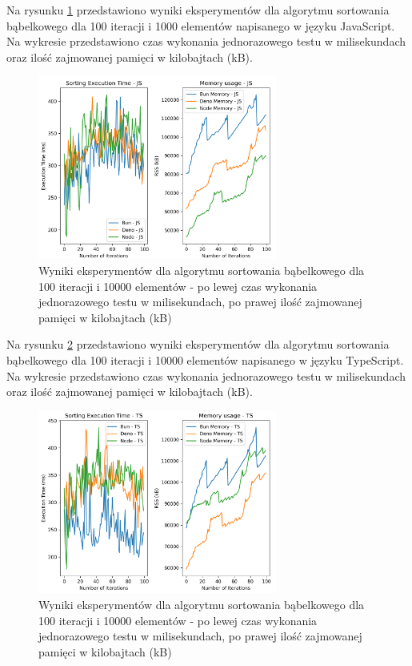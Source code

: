 Na rysunku \ref{fig:bubble_sorting_e2} przedstawiono wyniki eksperymentów dla algorytmu sortowania bąbelkowego dla 100 iteracji i 1000 elementów napisanego w języku JavaScript. Na wykresie przedstawiono czas wykonania jednorazowego testu w milisekundach oraz ilość zajmowanej pamięci w kilobajtach (kB).

\begin{figure}[H]
  \centering
  \includegraphics[width=0.7\textwidth]{Figures/sorting/sorting_bubble_100_10000_js.png}
  \caption{Wyniki eksperymentów dla algorytmu sortowania bąbelkowego dla 100 iteracji i 10000 elementów - po lewej czas wykonania jednorazowego testu w milisekundach, po prawej ilość zajmowanej pamięci w kilobajtach (kB)}
  \label{fig:bubble_sorting_e2}
\end{figure}

Na rysunku \ref{fig:bubble_sorting_e2_ts} przedstawiono wyniki eksperymentów dla algorytmu sortowania bąbelkowego dla 100 iteracji i 10000 elementów napisanego w języku TypeScript. Na wykresie przedstawiono czas wykonania jednorazowego testu w milisekundach oraz ilość zajmowanej pamięci w kilobajtach (kB).

\begin{figure}[H]
  \centering
  \includegraphics[width=0.7\textwidth]{Figures/sorting/sorting_bubble_100_10000_ts.png}
  \caption{Wyniki eksperymentów dla algorytmu sortowania bąbelkowego dla 100 iteracji i 10000 elementów - po lewej czas wykonania jednorazowego testu w milisekundach, po prawej ilość zajmowanej pamięci w kilobajtach (kB)}
  \label{fig:bubble_sorting_e2_ts}
\end{figure}

